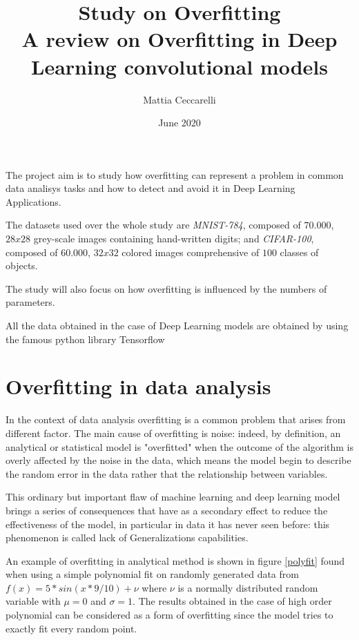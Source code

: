 \documentclass[11pt,a4paper]{article}
\title{\Huge{\textbf{Study on Overfitting}} \\ 
                \vspace{5mm}
                \large{A review on Overfitting in Deep Learning convolutional models}}
\author{Mattia Ceccarelli}
\date{June 2020}
\begin{document}
\maketitle

The project aim is to study how overfitting can represent a problem in common data analisys tasks and how to detect and avoid it in Deep Learning Applications.

The datasets used over the whole study are \textit{MNIST-784}, composed of $70.000$, $28 x 28$ grey-scale images containing hand-written digits; and \textit{CIFAR-100}, composed of $60.000$, $32 x 32$ colored images comprehensive of $100$ classes of objects.

The study will also focus on how overfitting is influenced by the numbers of parameters.

All the data obtained in the case of Deep Learning models are obtained by using the famous python library Tensorflow \cite{tf} 

\section*{Overfitting in data analysis}

In the context of data analysis overfitting is a common problem that arises from different factor. 
The main cause of overfitting is noise: indeed, by definition, an analytical or statistical model is "overfitted" when the outcome of the algorithm is overly affected by the noise in the data, which means the model begin to describe the random error in the data rather that the relationship between variables.

This ordinary but important flaw of machine learning and deep learning model brings a series of consequences that have as a secondary effect to reduce the effectiveness of the model, in particular in data it has never seen before: this phenomenon is called lack of Generalizations capabilities.

An example of overfitting in analytical method is shown in figure \ref{polyfit} found when using a simple polynomial fit on randomly generated data from $f(x) = 5 * sin(x * 9 / 10) + \nu$ where $\nu$ is a normally distributed random variable with $\mu = 0$ and $\sigma = 1$. The results obtained in the case of high order polynomial can be considered as a form of overfitting since the model tries to exactly fit every random  point.    
\end{document}
